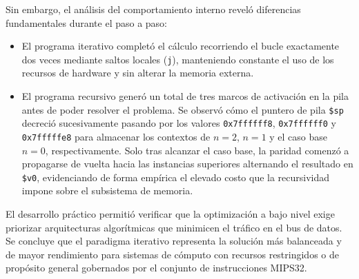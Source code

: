 \documentclass[12pt,letterpaper]{article}
\begin{document}
Sin embargo, el análisis del comportamiento interno reveló diferencias fundamentales durante el paso a paso:
\begin{itemize}
    \item El programa iterativo completó el cálculo recorriendo el bucle exactamente dos veces mediante saltos locales (\texttt{j}), manteniendo constante el uso de los recursos de hardware y sin alterar la memoria externa.
    \item El programa recursivo generó un total de tres marcos de activación en la pila antes de poder resolver el problema. Se observó cómo el puntero de pila \texttt{\$sp} decreció sucesivamente pasando por los valores \texttt{0x7ffffff8}, \texttt{0x7ffffff0} y \texttt{0x7fffffe8} para almacenar los contextos de $n=2$, $n=1$ y el caso base $n=0$, respectivamente. Solo tras alcanzar el caso base, la paridad comenzó a propagarse de vuelta hacia las instancias superiores alternando el resultado en \texttt{\$v0}, evidenciando de forma empírica el elevado costo que la recursividad impone sobre el subsistema de memoria.
\end{itemize}

El desarrollo práctico permitió verificar que la optimización a bajo nivel exige priorizar arquitecturas algorítmicas que minimicen el tráfico en el bus de datos. Se concluye que el paradigma iterativo representa la solución más balanceada y de mayor rendimiento para sistemas de cómputo con recursos restringidos o de propósito general gobernados por el conjunto de instrucciones MIPS32.
\end{document}

